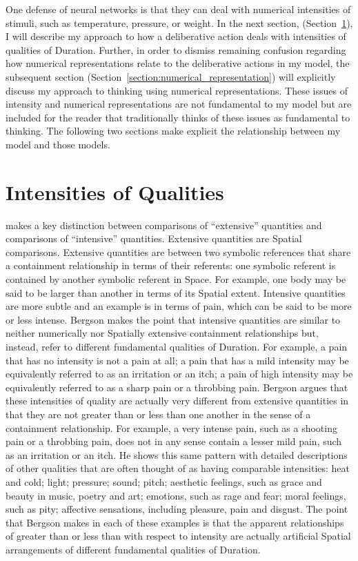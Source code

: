 One defense of neural networks is that they can deal with numerical
intensities of stimuli, such as temperature, pressure, or weight.  In
the next section, (Section~\ref{section:intensities_of_qualities}), I
will describe my approach to how a deliberative action deals with
intensities of qualities of Duration.  Further, in order to dismiss
remaining confusion regarding how numerical representations relate to
the deliberative actions in my model, the subsequent section
(Section~\ref{section:numerical_representation}) will explicitly
discuss my approach to thinking using numerical representations.
These issues of intensity and numerical representations are not
fundamental to my model but are included for the reader that
traditionally thinks of these issues as fundamental to thinking.  The
following two sections make explicit the relationship between my model
and those models.

\section{Intensities of Qualities}
\label{section:intensities_of_qualities}

\cite{bergson:1910} makes a key distinction between comparisons of
``extensive'' quantities and comparisons of ``intensive'' quantities.
Extensive quantities are Spatial comparisons.  Extensive quantities
are between two symbolic references that share a containment
relationship in terms of their referents: one symbolic referent is
contained by another symbolic referent in Space.  For example, one
body may be said to be larger than another in terms of its Spatial
extent.  Intensive quantities are more subtle and an example is in
terms of pain, which can be said to be more or less intense.  Bergson
makes the point that intensive quantities are similar to neither
numerically nor Spatially extensive containment relationships but,
instead, refer to different fundamental qualities of Duration.  For
example, a pain that has no intensity is not a pain at all; a pain
that has a mild intensity may be equivalently referred to as an
irritation or an itch; a pain of high intensity may be equivalently
referred to as a sharp pain or a throbbing pain.  Bergson argues that
these intensities of quality are actually very different from
extensive quantities in that they are not greater than or less than
one another in the sense of a containment relationship.  For example,
a very intense pain, such as a shooting pain or a throbbing pain, does
not in any sense contain a lesser mild pain, such as an irritation or
an itch.  He shows this same pattern with detailed descriptions of
other qualities that are often thought of as having comparable
intensities: heat and cold; light; pressure; sound; pitch; aesthetic
feelings, such as grace and beauty in music, poetry and art; emotions,
such as rage and fear; moral feelings, such as pity; affective
sensations, including pleasure, pain and disgust.  The point that
Bergson makes in each of these examples is that the apparent
relationships of greater than or less than with respect to intensity
are actually artificial Spatial arrangements of different fundamental
qualities of Duration.

